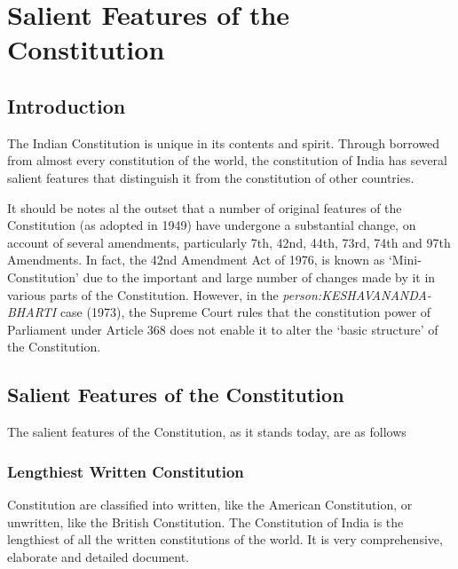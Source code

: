 \twocolumn
\printendnotes
\cleardoublepage

%

\chapter{Salient Features of the Constitution}

\section{Introduction}

The Indian Constitution is unique in its contents and spirit. Through borrowed from almost every constitution of the world, the constitution of India has several salient features that distinguish it from the constitution of other countries.

It should be notes al the outset that a number of original features of the Constitution (as adopted in 1949) have undergone a substantial change, on account of several amendments, particularly 7th, 42nd, 44th, 73rd, 74th and 97th Amendments. In fact, the 42nd Amendment Act of 1976, is known as `Mini-Constitution' due to the important and large number of changes made by it in various parts of the Constitution. However, in the { \textit{\gls{person:KESHAVANANDA-BHARTI}}} case (1973), the Supreme Court rules that the constitution power of Parliament under Article 368 does not enable it to alter the `basic structure' of the Constitution.

\section{Salient Features of the Constitution}

The salient features of the Constitution, as it stands today, are as follows

\subsection{Lengthiest Written Constitution}

Constitution are classified into written, like the American Constitution, or unwritten, like the British Constitution. The Constitution of India is the lengthiest of all the written constitutions of the world. It is very comprehensive, elaborate and detailed document.

